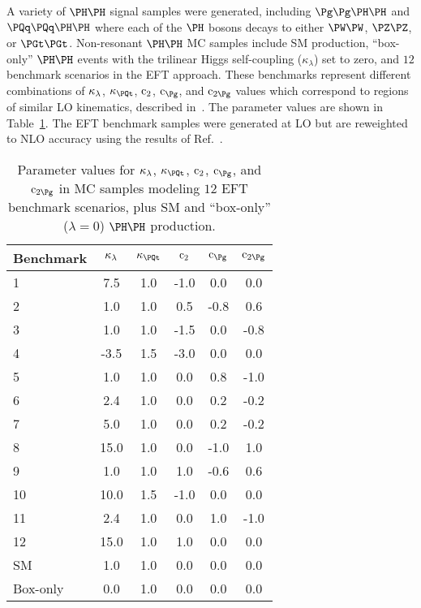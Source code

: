 A variety of $\HH$ signal samples were generated, including $\ggHH$ and $\qqHH$
where each of the $\PHiggs$ bosons decays to either $\PW\PW$, $\PZ\PZ$, or $\PGt\PGt$.
Non-resonant $\HH$ MC samples include SM production, ``box-only'' $\HH$ events with
the trilinear Higgs self-coupling ($\kappa_{\lambda}$) set to zero, and $12$ benchmark scenarios
in the EFT approach.  These benchmarks represent different combinations of
$\kappa_{\lambda}$, $\kappat$, $\text{c}_{2}$, $\cg$, and $\cgg$ values which correspond
to regions of similar LO kinematics, described in~\cite{Carvalho:2015ttv}.  The parameter
values are shown in Table~\ref{tab:HH_benchmarks}.  The EFT benchmark samples were
generated at LO but are reweighted to NLO accuracy using the results of Ref.~\cite{Buchalla:2018yce}.

\begin{table}[!h]
\begin{center}
\begin{tabular}{|l|c|c|c|c|c|}

\hline
Benchmark & $\kappa_{\lambda}$  & $\kappat$ & $\text{c}_{2}$ & $\cg$ &  $\cgg$ \\
\hline
1         & 7.5        & 1.0       & -1.0    & 0.0   & 0.0  \\
2         & 1.0        & 1.0       &  0.5    & -0.8  & 0.6  \\
3         & 1.0        & 1.0       & -1.5    & 0.0   & -0.8 \\
4         & -3.5       & 1.5       & -3.0    & 0.0   & 0.0  \\
5         & 1.0        & 1.0       & 0.0     & 0.8   & -1.0 \\
6         & 2.4        & 1.0       & 0.0     & 0.2   & -0.2 \\
7         & 5.0        & 1.0       & 0.0     & 0.2   & -0.2 \\
8         & 15.0       & 1.0       & 0.0     & -1.0  & 1.0  \\
9         & 1.0        & 1.0       & 1.0     & -0.6  & 0.6  \\
10        & 10.0       & 1.5       & -1.0    & 0.0   & 0.0  \\
11        & 2.4        & 1.0       & 0.0     & 1.0   & -1.0 \\
12        & 15.0       & 1.0       & 1.0     & 0.0   & 0.0  \\
\hline
SM        & 1.0        & 1.0       & 0.0     & 0.0   & 0.0  \\
Box-only  & 0.0        & 1.0       & 0.0     & 0.0   & 0.0  \\
\hline

\end{tabular}
\end{center}
\caption{
  Parameter values for $\kappa_{\lambda}$, $\kappat$, $\text{c}_{2}$, $\cg$, and
  $\cgg$ in MC samples modeling $12$ EFT benchmark scenarios, plus SM
  and ``box-only'' ($\lambda = 0$) $\HH$ production.
}
\label{tab:HH_benchmarks}
\end{table}


